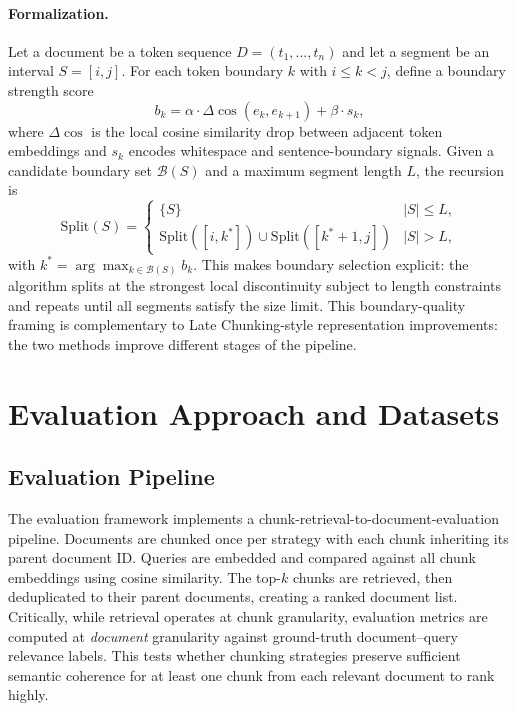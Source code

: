 \documentclass[conference]{IEEEtran}
\begin{document}
\paragraph{Formalization.} Let a document be a token sequence
$D = (t_1, \dots, t_n)$ and let a segment be an interval $S = [i, j]$. For
each token boundary $k$ with $i \le k < j$, define a boundary strength score
\begin{equation}
b_k = \alpha \cdot \Delta\!\cos(e_k, e_{k+1}) + \beta \cdot s_k,
\end{equation}
where $\Delta\!\cos$ is the local cosine similarity drop between adjacent
token embeddings and $s_k$ encodes whitespace and sentence-boundary signals.
Given a candidate boundary set $\mathcal{B}(S)$ and a maximum segment
length $L$, the recursion is
\begin{equation}
\mathrm{Split}(S) =
\begin{cases}
\{S\} & |S| \le L,\\
\mathrm{Split}([i, k^*]) \cup \mathrm{Split}([k^* + 1, j]) & |S| > L,
\end{cases}
\end{equation}
with $k^* = \arg\max_{k \in \mathcal{B}(S)} b_k$. This makes boundary
selection explicit: the algorithm splits at the strongest local
discontinuity subject to length constraints and repeats until all segments
satisfy the size limit. This boundary-quality framing is complementary to
Late Chunking-style representation improvements: the two methods improve
different stages of the pipeline.

\section{Evaluation Approach and Datasets}

\subsection{Evaluation Pipeline}

The evaluation framework implements a chunk-retrieval-to-document-evaluation
pipeline. Documents are chunked once per strategy with each chunk inheriting
its parent document ID. Queries are embedded and compared against all chunk
embeddings using cosine similarity. The top-$k$ chunks are retrieved, then
deduplicated to their parent documents, creating a ranked document list.
Critically, while retrieval operates at chunk granularity, evaluation
metrics are computed at \emph{document} granularity against ground-truth
document--query relevance labels. This tests whether chunking strategies
preserve sufficient semantic coherence for at least one chunk from each
relevant document to rank highly.
\end{document}
